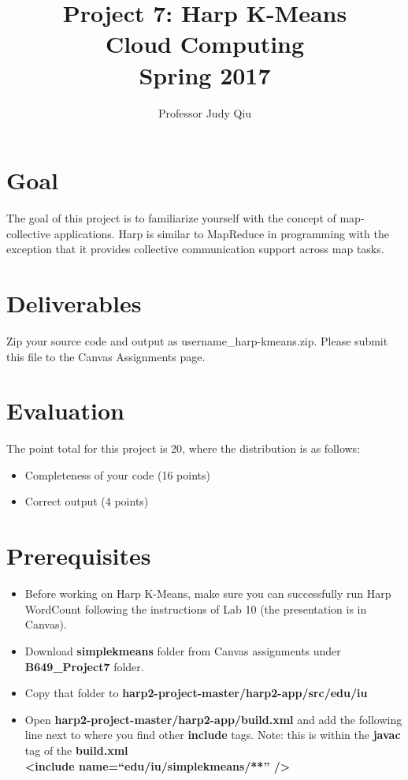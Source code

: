 \documentclass{article}
\begin{document}
\title{Project 7: Harp K-Means\\ Cloud Computing\\ Spring 2017}         %
\author{Professor Judy Qiu }        %
\date{}
\maketitle
\makeatother     %
\pagestyle{plain}
\section*{Goal}
The goal of this project is to familiarize yourself with the concept of map-collective applications. Harp is similar to MapReduce in programming with the exception that it provides collective communication support across map tasks.

\section*{Deliverables}
Zip your source code and output as username\_harp-kmeans.zip. Please submit this file to the Canvas Assignments page.

\section*{Evaluation}
The point total for this project is 20, where the distribution is as follows:
\begin{itemize}
\item Completeness of your code (16 points)
\item Correct output (4 points)
\end{itemize}

\section*{Prerequisites}
\begin{itemize}
\item Before working on Harp K-Means, make sure you can successfully run Harp WordCount following the instructions of Lab 10 (the presentation is in Canvas).
\item Download \textbf{simplekmeans} folder from Canvas assignments under \textbf{B649\_Project7} folder.
\item Copy that folder to \textbf{harp2-project-master/harp2-app/src/edu/iu}
\item Open \textbf{harp2-project-master/harp2-app/build.xml} and add the following line next to where you find other \textbf{include} tags. Note: this is within the \textbf{javac} tag of the \textbf{build.xml}\\
\textbf{\textless include name=``edu/iu/simplekmeans/**'' /\textgreater}
\end{itemize}
\end{document}
